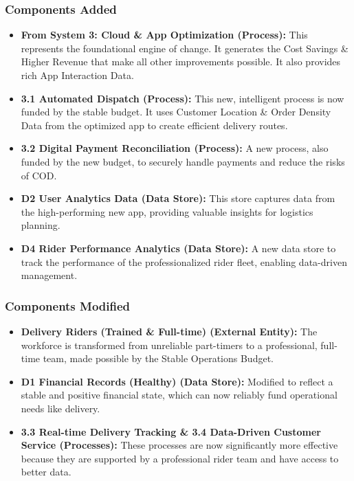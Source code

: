\documentclass[12pt,a4paper]{article}
\begin{document}
\subsubsection{Components Added}
\begin{tcolorbox}[colback=green!5!white,colframe=green!75!black,title=New Components]
\begin{itemize}
    \item \textbf{From System 3: Cloud \& App Optimization (Process):} This represents the foundational engine of change. It generates the Cost Savings \& Higher Revenue that make all other improvements possible. It also provides rich App Interaction Data.
    \item \textbf{3.1 Automated Dispatch (Process):} This new, intelligent process is now funded by the stable budget. It uses Customer Location \& Order Density Data from the optimized app to create efficient delivery routes.
    \item \textbf{3.2 Digital Payment Reconciliation (Process):} A new process, also funded by the new budget, to securely handle payments and reduce the risks of COD.
    \item \textbf{D2 User Analytics Data (Data Store):} This store captures data from the high-performing new app, providing valuable insights for logistics planning.
    \item \textbf{D4 Rider Performance Analytics (Data Store):} A new data store to track the performance of the professionalized rider fleet, enabling data-driven management.
\end{itemize}
\end{tcolorbox}

\subsubsection{Components Modified}
\begin{tcolorbox}[colback=yellow!5!white,colframe=yellow!75!black,title=Modified]
\begin{itemize}
    \item \textbf{Delivery Riders (Trained \& Full-time) (External Entity):} The workforce is transformed from unreliable part-timers to a professional, full-time team, made possible by the Stable Operations Budget.
    \item \textbf{D1 Financial Records (Healthy) (Data Store):} Modified to reflect a stable and positive financial state, which can now reliably fund operational needs like delivery.
    \item \textbf{3.3 Real-time Delivery Tracking \& 3.4 Data-Driven Customer Service (Processes):} These processes are now significantly more effective because they are supported by a professional rider team and have access to better data.
\end{itemize}
\end{tcolorbox}
\end{document}
